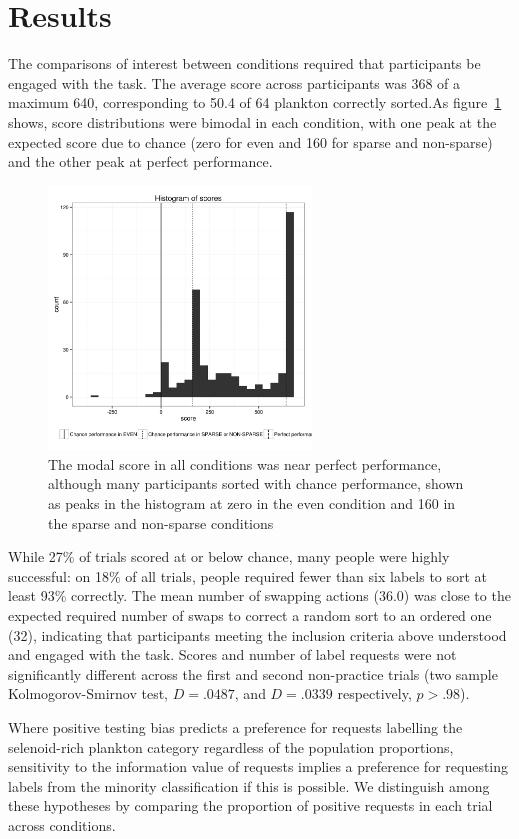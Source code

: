 \documentclass[10pt,letterpaper]{article}
\begin{document}
\section{Results}
The comparisons of interest between conditions required that participants be engaged with the task. The average score across participants was 368 of a maximum 640, corresponding to 50.4 of 64 plankton correctly sorted.As figure~\ref{scorehist} shows, score distributions were bimodal in each condition, with one peak at the expected score due to chance (zero for {\sc even} and 160 for {\sc sparse} and {\sc non-sparse}) and the other peak at perfect performance.

\begin{figure}[t]
\centering
\includegraphics[width=.5\textwidth,height=7cm,keepaspectratio]{scoreshist.png}
\caption{The modal score in all conditions was near perfect performance, although many participants sorted with chance performance, shown as peaks in the histogram at zero in the {\sc even} condition and 160 in the {\sc sparse} and {\sc non-sparse} conditions}
\label{scorehist}
\end{figure}


While 27\% of trials scored at or below chance, many people were highly successful: on 18\% of all trials, people required fewer than six labels to sort at least 93\% correctly. The mean number of swapping actions (36.0) was close to the expected required number of swaps to correct a random sort to an ordered one (32), indicating that participants meeting the inclusion criteria above understood and engaged with the task. Scores and number of label requests were not significantly different across the first and second non-practice trials (two sample Kolmogorov-Smirnov test, $D=.0487$, and $D=.0339$ respectively, $p>.98$).

Where positive testing bias predicts a preference for requests labelling the selenoid-rich plankton category regardless of the population proportions, sensitivity to the information value of requests implies a preference for requesting labels from the minority classification if this is possible. We distinguish among these hypotheses by comparing the proportion of positive requests in each trial across conditions.
\end{document}
